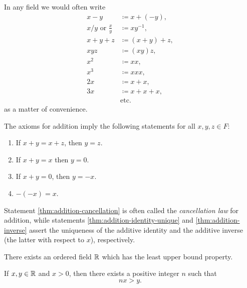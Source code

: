 \begin{sectionthm}
    In any field we would often write
    \begin{align*}
        x - y &\coloneqq x + (-y), \\
        x/y \text{ or } \frac{x}{y}&\coloneqq xy^{-1},\\
        x + y + z &\coloneqq (x + y) + z,\\
        xyz &\coloneqq (xy)z,\\
        x^2 &\coloneqq xx,\\
        x^3 &\coloneqq xxx,\\
        2x &\coloneqq x + x,\\
        3x &\coloneqq x + x + x,\\
        &\text{etc.}
    \end{align*}
    as a matter of convenience.
\end{sectionthm}

\begin{theorem}
    The axioms for addition imply the following statements for all \(x, y, z \in F\):
    \begin{enumerate}[label=(\alph*), wide]
        \item If \(x + y = x + z\), then \(y = z\).\label{thm:addition-cancellation}
        \item If \(x + y = x\) then \(y = 0\).\label{thm:addition-identity-unique}
        \item If \(x + y = 0\), then \(y = -x\).\label{thm:addition-inverse}
        \item \(-(-x) = x\).
    \end{enumerate}
\end{theorem}

Statement \ref{thm:addition-cancellation} is often called the \emph{cancellation law} for addition, while statements \ref{thm:addition-identity-unique} and \ref{thm:addition-inverse} assert the uniqueness of the additive identity and the additive inverse (the latter with respect to \(x\)), respectively.

\begin{theorem}
    There exists an ordered field \(\mathbb{R}\) which has the least upper bound property.
\end{theorem}

\begin{theorem}
    \label{thm:archimedean-property}
    If \(x, y \in \mathbb{R}\) and \(x > 0\), then there exists a positive integer \(n\) such that
    \[
        nx > y.
    \]
\end{theorem}

